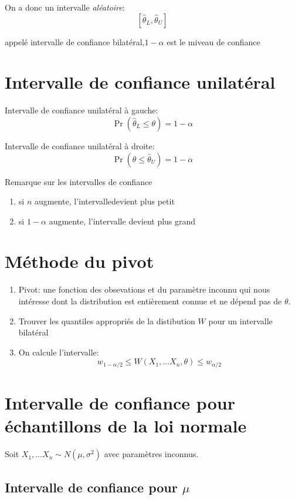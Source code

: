 On a donc un intervalle \emph{aléatoire}:
\[ [\hat{\theta}_L,\hat{\theta}_U
]\]

appelé intervalle de confiance bilatéral,$1-\alpha$ est le miveau de confiance

\section{Intervalle de confiance unilatéral}

Intervalle de confiance unilatéral à gauche:
\[\Pr(\hat{\theta}_{L} \leq \theta)=1-\alpha\]  

Intervalle de confiance unilatéral à droite:
\[\Pr(\theta \leq \hat{\theta}_{U})=1-\alpha\]

Remarque sur les intervalles de confiance
\begin{enumerate}
\item si $n$ augmente, l'intervalledevient plus petit
\item si $1- \alpha$ augmente, l'intervalle devient plus grand
\end{enumerate}

\section{Méthode du pivot}

 \begin{enumerate}
 \item Pivot: une fonction des obsevations et du paramètre inconnu qui nous intéresse
 dont la distribution est entièrement connue et ne dépend pas de $\theta$. 
 \item Trouver les quantiles appropriés de la distibution $W$ pour un intervalle bilatéral
 \item On calcule l'intervalle:
 	\[w_{1-\alpha/2} \leq W(X_1, \dots X_n, \theta) \leq w_{\alpha/2}\]
 \end{enumerate}
 
\section{Intervalle de confiance pour échantillons de la loi normale}

Soit $X_1, \dots X_n \sim N(\mu, \sigma^2)$ avec paramètres inconnus.

\subsection*{Intervalle de confiance pour $\mu$}

